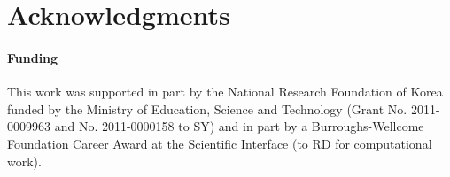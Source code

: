 \documentclass[letter]{bioinfo}
\begin{document}
\section*{Acknowledgments}

\paragraph{Funding\textcolon}
This work was supported in part by the National Research Foundation of Korea funded by the Ministry of Education, Science and Technology (Grant No. 2011-0009963 and No. 2011-0000158 to SY) and in part by a Burroughs-Wellcome Foundation Career Award at the Scientific Interface (to RD for computational work).


%
%

\end{document}

